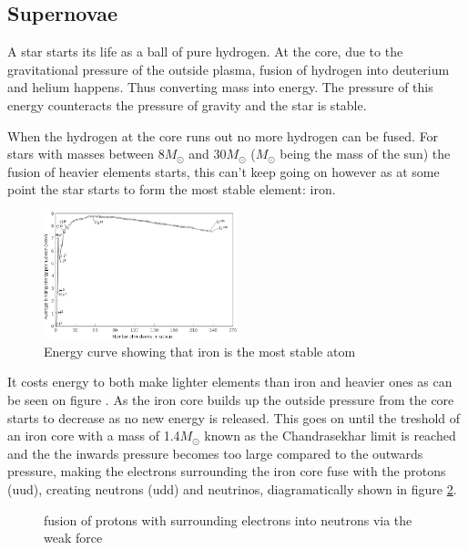 \documentclass[11pt,a4paper,faculty=we,language=en,doctype=report]{cls/ugent-doc}
\begin{document}
\subsection{Supernovae}
\label{sec:supernovae}
A star starts its life as a ball of pure hydrogen. At the core, due to the
gravitational pressure of the outside plasma, fusion of hydrogen into deuterium
and helium happens. Thus converting mass into energy. The pressure of this energy
counteracts the pressure of gravity and the star is stable.

When the hydrogen at the core runs out no more hydrogen can be fused. For stars
with masses between $8M_\odot$ and $30M_\odot$ ($M_\odot$ being the mass of the sun)
the fusion of heavier elements starts, this can't keep going on however as at
some point the star starts to form the most stable element: iron. 
\begin{figure}[!ht]
	\centering
	\includegraphics[width=0.5\textwidth]{Binding_energy_curve.png}
	\caption{Energy curve showing that iron is the most stable atom}
	\label{fig:BindingEnergyCurve}
\end{figure}
It costs energy
to both make lighter elements than iron and heavier ones as can be seen on
figure \label{fig:BindingEnergyCurve}.  As the iron core builds up the outside
pressure from the core starts to decrease as no new energy is released. This
goes on until  the treshold of an iron core with a mass of 1.4$M_\odot$ known
as the Chandrasekhar limit is reached and the the inwards pressure becomes too
large compared to the outwards pressure, making the electrons surrounding the
iron core fuse with the protons (uud), creating neutrons (udd) and neutrinos,
diagramatically shown in figure
\ref{fig:CoreFusion}.
\begin{figure}
	\centering
	\caption{fusion of protons with surrounding electrons into neutrons via the weak force}
	\label{fig:CoreFusion}
\end{figure}\\
\end{document}
